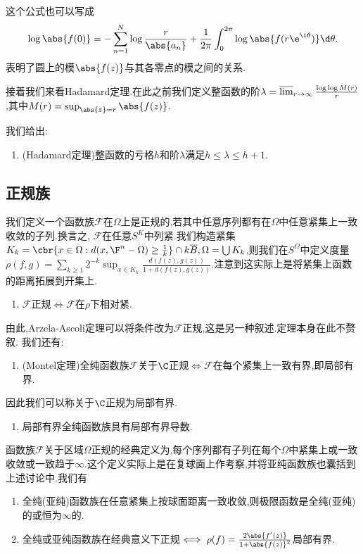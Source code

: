 \documentclass{article}
\begin{document}
这个公式也可以写成$$\log\abs{f(0)}=-\sum_{n=1}^N\log\frac{r}{\abs{a_n}}+\frac{1}{2\pi}\int_{0}^{2\pi}\log\abs{f(r\e^{\i\theta})}\d\theta.$$
表明了圆上的模$\abs{f(z)}$与其各零点的模之间的关系.

接着我们来看Hadamard定理.在此之前我们定义整函数的阶$\lambda=\varlimsup_{r\to\infty}\frac{\log\log M(r)}{r}$,其中$M(r)=\sup_{\abs{z}=r}\abs{f(z)}$.

我们给出:
\begin{enumerate}[resume]
    \item (Hadamard定理)整函数的亏格$h$和阶$\lambda$满足$h\leq \lambda\leq h+1$.
\end{enumerate}
\tbc

\subsection{正规族}
我们定义一个函数族$\mathcal{F}$在$\Omega$上是正规的,若其中任意序列都有在$\Omega$中任意紧集上一致收敛的子列.换言之, $\mathcal{F}$在任意$S^K$中列紧.我们构造紧集$K_k=\cbr{x\in\Omega:d(x,\F^n-\Omega)\geq\frac{1}{k}}\cap k\overline{B},\Omega=\bigcup K_k$,则我们在$S^\Omega$中定义度量$\rho(f,g)=\sum_{k\geq 1}2^{-k}\sup_{x\in K_k}\frac{d(f(z),g(z))}{1+d(f(z),g(z))}$.注意到这实际上是将紧集上函数的距离拓展到开集上.

\begin{enumerate}
    \item $\mathcal{F}$正规$\iff \mathcal{F}$在$\rho$下相对紧.\\
\end{enumerate}
由此,Arzela-Ascoli定理可以将条件改为$\mathcal{F}$正规,这是另一种叙述.定理本身在此不赘叙.
我们还有:
\begin{enumerate}[resume]
    \item (Montel定理)全纯函数族$\mathcal{F}$关于$\C$正规$\iff \mathcal{F}$在每个紧集上一致有界,即局部有界.
\end{enumerate}
因此我们可以称关于$\C$正规为局部有界.
\begin{enumerate}[resume]
    \item 局部有界全纯函数族具有局部有界导数.
\end{enumerate}

函数族$\mathcal{F}$关于区域$\Omega$正规的经典定义为,每个序列都有子列在每个$\Omega$中紧集上或一致收敛或一致趋于$\infty$.这个定义实际上是在复球面上作考察,并将亚纯函数族也囊括到上述讨论中.我们有
\begin{enumerate}[resume]
    \item 全纯(亚纯)函数族在任意紧集上按球面距离一致收敛,则极限函数是全纯(亚纯)的或恒为$\infty$的.\\
    \item 全纯或亚纯函数族在经典意义下正规$\iff \rho(f)=\frac{2\abs{f'(z)}}{1+\abs{f(z)}^2}$局部有界.
\end{enumerate}
\end{document}
